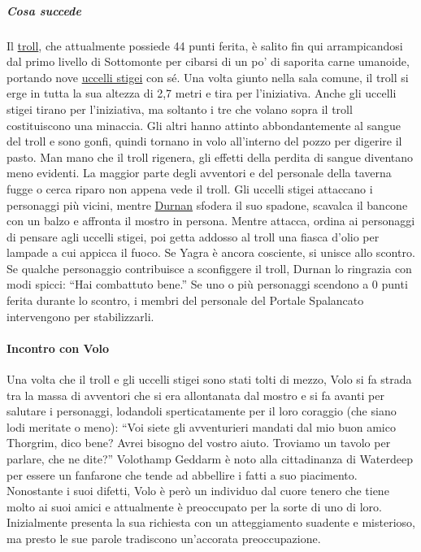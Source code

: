 \documentclass{article}
\begin{document}
                        \subparagraph{Cosa succede}
Il \hyperlink{troll}{ troll}, che attualmente possiede 44 punti ferita, è salito
fin qui arrampicandosi dal primo livello di Sottomonte per
cibarsi di un po' di saporita carne umanoide, portando nove
\hyperlink{uccelli}{uccelli stigei} con sé. Una volta giunto nella sala comune,
il troll si erge in tutta la sua altezza di 2,7 metri e tira per
l'iniziativa. Anche gli uccelli stigei tirano per l'iniziativa,
ma soltanto i tre che volano sopra il troll costituiscono una
minaccia. Gli altri hanno attinto abbondantemente al sangue
del troll e sono gonfi, quindi tornano in volo all’interno del
pozzo per digerire il pasto. Man mano che il troll rigenera,
gli effetti della perdita di sangue diventano meno evidenti.
La maggior parte degli avventori e del personale della
taverna fugge o cerca riparo non appena vede il troll. Gli
uccelli stigei attaccano i personaggi più vicini, mentre
\hyperlink{Duran}{Durnan} sfodera il suo spadone,
scavalca il bancone con un balzo e affronta il mostro in
persona. Mentre attacca, ordina ai personaggi di pensare
agli uccelli stigei, poi getta addosso al troll una fiasca d'olio
per lampade a cui appicca il fuoco. Se Yagra è ancora
cosciente, si unisce allo scontro. Se qualche personaggio
contribuisce a sconfiggere il troll, Durnan lo ringrazia con
modi spicci: “Hai combattuto bene.”
Se uno o più personaggi scendono a 0 punti ferita
durante lo scontro, i membri del personale del Portale
Spalancato intervengono per stabilizzarli.

                \paragraph{Incontro con Volo} 
Una volta che il troll e gli uccelli stigei sono stati tolti di
mezzo, Volo si fa strada tra la massa di avventori che si
era allontanata dal mostro e si fa avanti per salutare i
personaggi, lodandoli sperticatamente per il loro coraggio
(che siano lodi meritate o meno): “Voi siete gli avventurieri mandati dal mio buon amico Thorgrim,
dico bene? Avrei bisogno del vostro aiuto. Troviamo un
tavolo per parlare, che ne dite?”
Volothamp Geddarm è noto alla cittadinanza di
Waterdeep per essere un fanfarone che tende ad abbellire
i fatti a suo piacimento. Nonostante i suoi difetti, Volo
è però un individuo dal cuore tenero che tiene molto ai
suoi amici e attualmente è preoccupato per la sorte di
uno di loro. Inizialmente presenta la sua richiesta con un
atteggiamento suadente e misterioso, ma presto le sue
parole tradiscono un’accorata preoccupazione.
\end{document}
